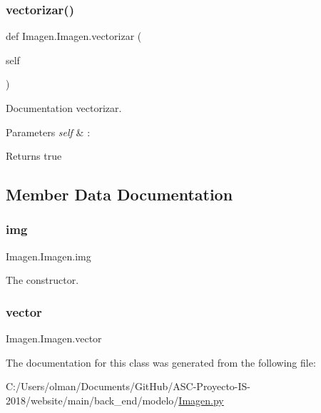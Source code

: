 \subsubsection{\texorpdfstring{vectorizar()}{vectorizar()}}
{\footnotesize\ttfamily def Imagen.\+Imagen.\+vectorizar (\begin{DoxyParamCaption}\item[{}]{self }\end{DoxyParamCaption})}



Documentation vectorizar. 


\begin{DoxyParams}{Parameters}
{\em self} & \+: \\
\hline
\end{DoxyParams}
\begin{DoxyReturn}{Returns}
true 
\end{DoxyReturn}


\subsection{Member Data Documentation}
\mbox{\label{class_imagen_1_1_imagen_ae3a41e1a6fae0affa3b4735c50212093}} 
\subsubsection{\texorpdfstring{img}{img}}
{\footnotesize\ttfamily Imagen.\+Imagen.\+img}



The constructor. 

\mbox{\label{class_imagen_1_1_imagen_ad7ff22a9f89ed827ec52d0ccd8934141}} 
\subsubsection{\texorpdfstring{vector}{vector}}
{\footnotesize\ttfamily Imagen.\+Imagen.\+vector}



The documentation for this class was generated from the following file\+:\begin{DoxyCompactItemize}
\item 
C\+:/\+Users/olman/\+Documents/\+Git\+Hub/\+A\+S\+C-\/\+Proyecto-\/\+I\+S-\/2018/website/main/back\+\_\+end/modelo/\mbox{\hyperlink{_imagen_8py}{Imagen.\+py}}\end{DoxyCompactItemize}

